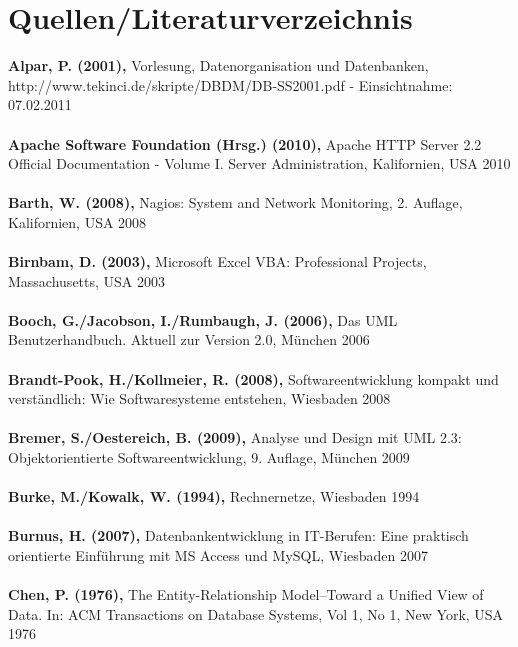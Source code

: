 \chapter*{Quellen/Literaturverzeichnis}



\textbf{Alpar, P. (2001),} Vorlesung, Datenorganisation und Datenbanken, http://www.tekinci.de/skripte/DBDM/DB-SS2001.pdf - Einsichtnahme: 07.02.2011\\\\
\textbf{Apache Software Foundation (Hrsg.) (2010),} Apache HTTP Server 2.2 Official Documentation - Volume I. Server Administration, Kalifornien, USA 2010\\\\
\textbf{Barth, W. (2008),} Nagios: System and Network Monitoring, 2. Auflage, Kalifornien, USA 2008\\\\
\textbf{Birnbam, D. (2003),} Microsoft Excel VBA: Professional Projects, Massachusetts, USA 2003\\\\
\textbf{Booch, G./Jacobson, I./Rumbaugh, J. (2006),} Das UML Benutzerhandbuch. Aktuell zur Version 2.0, München 2006\\\\
\textbf{Brandt-Pook, H./Kollmeier, R. (2008),} Softwareentwicklung kompakt und verständlich: Wie Softwaresysteme entstehen, Wiesbaden 2008\\\\
\textbf{Bremer, S./Oestereich, B. (2009),} Analyse und Design mit UML 2.3: Objektorientierte Softwareentwicklung, 9. Auflage, München 2009\\\\
\textbf{Burke, M./Kowalk, W. (1994),} Rechnernetze, Wiesbaden 1994\\\\
\textbf{Burnus, H. (2007),} Datenbankentwicklung in IT-Berufen: Eine praktisch orientierte Einführung mit MS Access und MySQL, Wiesbaden 2007\\\\
\textbf{Chen, P. (1976),} The Entity-Relationship Model--Toward a Unified View of Data. In: ACM Transactions on Database Systems, Vol 1, No 1, New York, USA 1976\\\\
